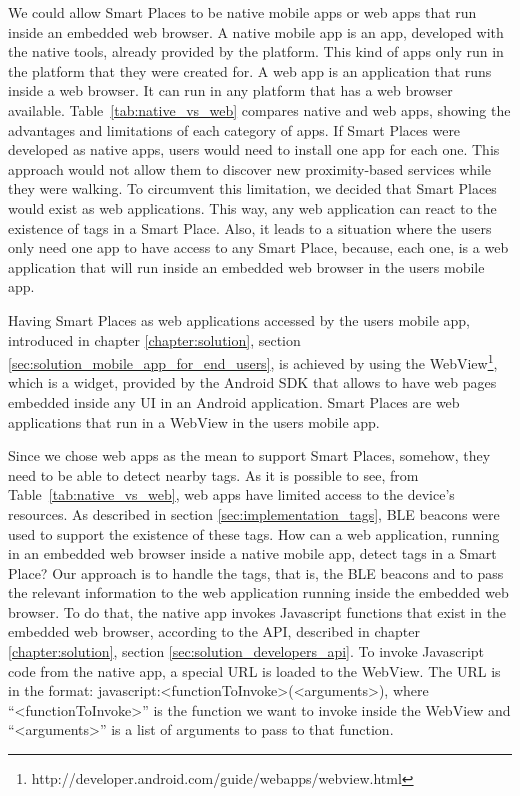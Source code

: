 We could allow Smart Places to be native mobile apps or web apps that run inside an embedded web browser.
A native mobile app is an app, developed with the native tools, already provided by the platform.
This kind of apps only run in the platform that they were created for.
A web app is an application that runs inside a web browser. It can run in any platform that has a web browser available.
Table~\ref{tab:native_vs_web} compares native and web apps, showing the advantages and limitations of each category of apps.
If Smart Places were developed as native apps, users would need to install one app for each one.
This approach would not allow them to discover new proximity-based services while they were walking.
To circumvent this limitation, we decided that Smart Places would exist as web applications.
This way, any web application can react to the existence of tags in a Smart Place. Also, it leads to a situation where the users only need one app to have access to any Smart Place, because, each one, is a web application that will run inside an embedded web browser in the users mobile app.



Having Smart Places as web applications accessed by the users mobile app, introduced in chapter \ref{chapter:solution}, section \ref{sec:solution_mobile_app_for_end_users}, is achieved by using the WebView\footnote{http://developer.android.com/guide/webapps/webview.html}, which is a widget, provided by the Android \gls{SDK} that allows to have web pages embedded inside any \gls{UI} in an Android application.
Smart Places are web applications that run in a WebView in the users mobile app.

Since we chose web apps as the mean to support Smart Places, somehow, they need to be able to detect nearby tags.
As it is possible to see, from Table~\ref{tab:native_vs_web}, web apps have limited access to the device's resources.
As described in section \ref{sec:implementation_tags}, \gls{BLE} beacons were used to support the existence of these tags.
How can a web application, running in an embedded web browser inside a native mobile app, detect tags in a Smart Place?
Our approach is to handle the tags, that is, the \gls{BLE} beacons and to pass the relevant information to the web application running inside the embedded web browser.
To do that, the native app invokes Javascript functions that exist in the embedded web browser, according to the \gls{API}, described in chapter \ref{chapter:solution}, section \ref{sec:solution_developers_api}.
To invoke Javascript code from the native app, a special \gls{URL} is loaded to the WebView.
The \gls{URL} is in the format: javascript:<functionToInvoke>(<arguments>), where ``<functionToInvoke>'' is the function we want to invoke inside the WebView and ``<arguments>'' is a list of arguments to pass to that function.

